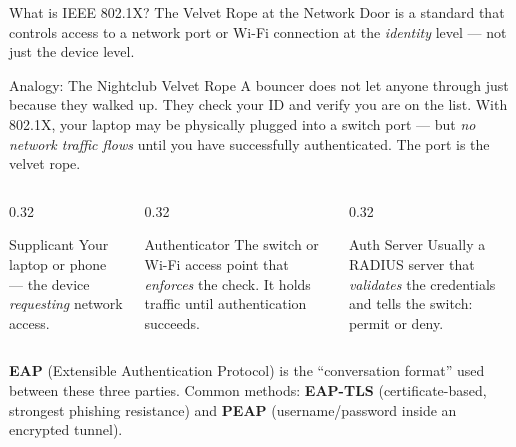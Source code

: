 \documentclass[aspectratio=169]{beamer}  %
\begin{document}
\begin{frame}{What is IEEE 802.1X? The Velvet Rope at the Network Door}
    \footnotesize
     is a standard that controls access to a network port or Wi-Fi connection at the \emph{identity} level --- not just the device level.

    \vspace{0.3em}
    \begin{exampleblock}{Analogy: The Nightclub Velvet Rope}
        \footnotesize
        A bouncer does not let anyone through just because they walked up. They check your ID and verify you are on the list. With 802.1X, your laptop may be physically plugged into a switch port --- but \emph{no network traffic flows} until you have successfully authenticated. The port is the velvet rope.
    \end{exampleblock}

    \vspace{0.3em}
    \begin{columns}[T]
        \begin{column}{0.32\textwidth}
            \begin{block}{Supplicant}
                \footnotesize
                Your laptop or phone --- the device \emph{requesting} network access.
            \end{block}
        \end{column}
        \begin{column}{0.32\textwidth}
            \begin{block}{Authenticator}
                \footnotesize
                The switch or Wi-Fi access point that \emph{enforces} the check. It holds traffic until authentication succeeds.
            \end{block}
        \end{column}
        \begin{column}{0.32\textwidth}
            \begin{block}{Auth Server}
                \footnotesize
                Usually a RADIUS server that \emph{validates} the credentials and tells the switch: permit or deny.
            \end{block}
        \end{column}
    \end{columns}

    \vspace{0.3em}
    \footnotesize
    \textbf{EAP} (Extensible Authentication Protocol) is the ``conversation format'' used between these three parties. Common methods: \textbf{EAP-TLS} (certificate-based, strongest phishing resistance) and \textbf{PEAP} (username/password inside an encrypted tunnel).
\end{frame}
\end{document}
